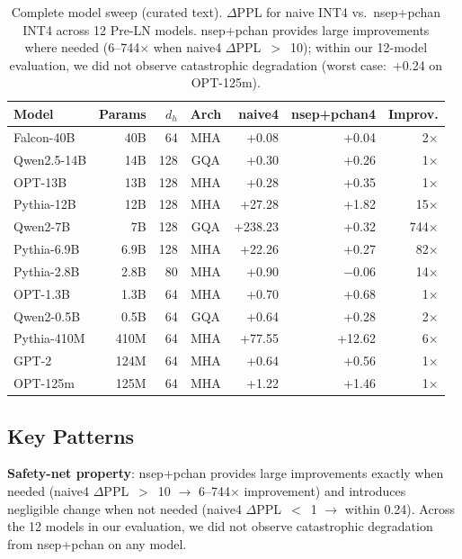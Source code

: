 \documentclass[11pt]{article}
\begin{document}
\begin{table}[t]
\centering
\small
\begin{tabular}{lrrcrrr}
\toprule
Model & Params & $d_h$ & Arch & naive4 & nsep+pchan4 & Improv. \\
\midrule
Falcon-40B & 40B & 64 & MHA & +0.08 & +0.04 & 2$\times$ \\
Qwen2.5-14B & 14B & 128 & GQA & +0.30 & +0.26 & 1$\times$ \\
OPT-13B & 13B & 128 & MHA & +0.28 & +0.35 & 1$\times$ \\
Pythia-12B & 12B & 128 & MHA & +27.28 & +1.82 & 15$\times$ \\
Qwen2-7B & 7B & 128 & GQA & +238.23 & +0.32 & 744$\times$ \\
Pythia-6.9B & 6.9B & 128 & MHA & +22.26 & +0.27 & 82$\times$ \\
Pythia-2.8B & 2.8B & 80 & MHA & +0.90 & $-$0.06 & 14$\times$ \\
OPT-1.3B & 1.3B & 64 & MHA & +0.70 & +0.68 & 1$\times$ \\
Qwen2-0.5B & 0.5B & 64 & GQA & +0.64 & +0.28 & 2$\times$ \\
Pythia-410M & 410M & 64 & MHA & +77.55 & +12.62 & 6$\times$ \\
GPT-2 & 124M & 64 & MHA & +0.64 & +0.56 & 1$\times$ \\
OPT-125m & 125M & 64 & MHA & +1.22 & +1.46 & 1$\times$ \\
\bottomrule
\end{tabular}
\caption{Complete model sweep (curated text). $\Delta$PPL for naive INT4 vs.\ nsep+pchan INT4 across 12 Pre-LN models. nsep+pchan provides large improvements where needed (6--744$\times$ when naive4 $\Delta$PPL~$>$~10); within our 12-model evaluation, we did not observe catastrophic degradation (worst case:~+0.24 on OPT-125m).}
\label{tab:sweep}
\end{table}

\subsection{Key Patterns}

\textbf{Safety-net property}: nsep+pchan provides large improvements exactly when needed (naive4 $\Delta$PPL~$>$~10 $\to$ 6--744$\times$ improvement) and introduces negligible change when not needed (naive4 $\Delta$PPL~$<$~1 $\to$ within 0.24). Across the 12 models in our evaluation, we did not observe catastrophic degradation from nsep+pchan on any model.
\end{document}
